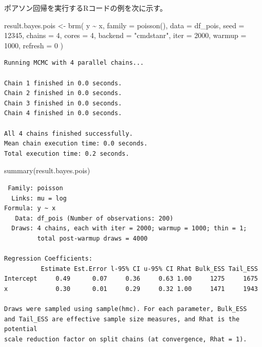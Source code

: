 \documentclass[
  a4paper,
]{ltjsbook}
\newenvironment{Shaded}{\begin{snugshade}}{\end{snugshade}}
\newcommand{\AttributeTok}[1]{\textcolor[rgb]{0.40,0.45,0.13}{#1}}
\newcommand{\DecValTok}[1]{\textcolor[rgb]{0.68,0.00,0.00}{#1}}
\newcommand{\FunctionTok}[1]{\textcolor[rgb]{0.28,0.35,0.67}{#1}}
\newcommand{\NormalTok}[1]{\textcolor[rgb]{0.00,0.23,0.31}{#1}}
\newcommand{\OtherTok}[1]{\textcolor[rgb]{0.00,0.23,0.31}{#1}}
\newcommand{\SpecialCharTok}[1]{\textcolor[rgb]{0.37,0.37,0.37}{#1}}
\newcommand{\StringTok}[1]{\textcolor[rgb]{0.13,0.47,0.30}{#1}}
\begin{document}
ポアソン回帰を実行するRコードの例を次に示す。

\begin{Shaded}
\begin{Highlighting}[]
\NormalTok{result.bayes.pois }\OtherTok{\textless{}{-}} \FunctionTok{brm}\NormalTok{(}
\NormalTok{    y }\SpecialCharTok{\textasciitilde{}}\NormalTok{ x,}
    \AttributeTok{family =} \FunctionTok{poisson}\NormalTok{(),}
    \AttributeTok{data =}\NormalTok{ df\_pois,}
    \AttributeTok{seed =} \DecValTok{12345}\NormalTok{,}
    \AttributeTok{chains =} \DecValTok{4}\NormalTok{, }\AttributeTok{cores =} \DecValTok{4}\NormalTok{, }\AttributeTok{backend =} \StringTok{"cmdstanr"}\NormalTok{,}
    \AttributeTok{iter =} \DecValTok{2000}\NormalTok{, }\AttributeTok{warmup =} \DecValTok{1000}\NormalTok{,}
    \AttributeTok{refresh =} \DecValTok{0}
\NormalTok{)}
\end{Highlighting}
\end{Shaded}

\begin{verbatim}
Running MCMC with 4 parallel chains...

Chain 1 finished in 0.0 seconds.
Chain 2 finished in 0.0 seconds.
Chain 3 finished in 0.0 seconds.
Chain 4 finished in 0.0 seconds.

All 4 chains finished successfully.
Mean chain execution time: 0.0 seconds.
Total execution time: 0.2 seconds.
\end{verbatim}

\begin{Shaded}
\begin{Highlighting}[]
\FunctionTok{summary}\NormalTok{(result.bayes.pois)}
\end{Highlighting}
\end{Shaded}

\begin{verbatim}
 Family: poisson 
  Links: mu = log 
Formula: y ~ x 
   Data: df_pois (Number of observations: 200) 
  Draws: 4 chains, each with iter = 2000; warmup = 1000; thin = 1;
         total post-warmup draws = 4000

Regression Coefficients:
          Estimate Est.Error l-95% CI u-95% CI Rhat Bulk_ESS Tail_ESS
Intercept     0.49      0.07     0.36     0.63 1.00     1275     1675
x             0.30      0.01     0.29     0.32 1.00     1471     1943

Draws were sampled using sample(hmc). For each parameter, Bulk_ESS
and Tail_ESS are effective sample size measures, and Rhat is the potential
scale reduction factor on split chains (at convergence, Rhat = 1).
\end{verbatim}
\end{document}
